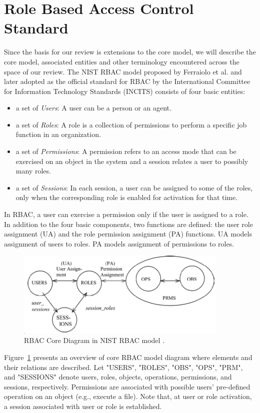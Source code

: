 \section{Role Based Access Control Standard} \label{sec:core-rbac}

Since the basis for our review is extensions to the core model, we will describe the core model, associated entities and other terminology encountered across the space of our review.  The NIST RBAC model proposed by Ferraiolo et al. \cite{ferraiolokuhn} and later adopted as the official standard for RBAC by the International Committee for Information Technology Standards (INCITS) consists of four basic entities:

\begin{itemize}
\setlength{\itemsep}{0.25pt}
\item a set of \emph{Users}: A user can be a person or an agent.
\item a set of \emph{Roles}: A role is a collection of permissions to perform a specific job function in an organization.
\item a set of \emph{Permissions}: A permission refers to an access mode that can be exercised on an object in the system and a session relates a user to possibly many roles.
\item a set of \emph{Sessions}: In each session, a user can be assigned to some of the roles, only when the corresponding role is enabled for activation for that time.		
\end{itemize}

In RBAC, a user can exercise a permission only if the user is assigned to a role.
In addition to the four basic components, two functions are defined:
the user role assignment (UA) and the role
permission assignment (PA) functions.
UA models assignment of users to roles.
PA models assignment of permissions to roles.

\begin{figure}[ht]
    \centering
        \includegraphics[width=4.0in]{sections/core-model.png}
    \caption{\label{fig:overview}RBAC Core Diagram in NIST RBAC model \cite{ferraiolokuhn}.}
\end{figure}

Figure~\ref{fig:overview} presents an overview of core RBAC model diagram where elements and their relations are described.
Let "USERS", "ROLES", "OBS", "OPS", "PRM", and "SESSIONS" denote users, roles, objects, operations, permissions, and sessions, respectively.
Permissions are associated with possible users' pre-defined operation on an object (e.g., execute a file).
Note that, at user or role activation, a session associated with user or role is established.
